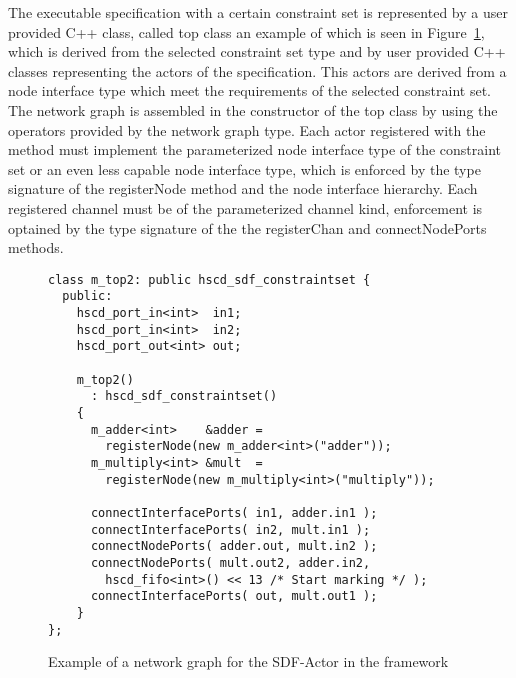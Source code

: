 The executable specification with a certain constraint set is
represented by a user provided C++ class, called top class an example of
which is seen in Figure~\ref{example-sdf-constraintset}, which is
derived from the selected \SysteMoC{} constraint set type and by
user provided C++ classes representing the actors of the specification.
This actors are derived from a \SysteMoC{} node interface type which
meet the requirements of the selected constraint set. The network graph
is assembled in the constructor of the top class by using the
operators provided by the \SysteMoC{} network graph type.
Each actor registered with the  method must implement
the parameterized node interface type of the constraint set or an even
less capable node interface type, which is enforced by the type signature
of the registerNode method and the node interface hierarchy.
Each registered channel must be of the parameterized channel kind,
enforcement is optained by the type signature of the
the registerChan and connectNodePorts methods.

\begin{figure}[h]
\centering
\begin{verbatim}
class m_top2: public hscd_sdf_constraintset {
  public:
    hscd_port_in<int>  in1;
    hscd_port_in<int>  in2;
    hscd_port_out<int> out;
    
    m_top2()
      : hscd_sdf_constraintset()
    {
      m_adder<int>    &adder =
        registerNode(new m_adder<int>("adder"));
      m_multiply<int> &mult  =
        registerNode(new m_multiply<int>("multiply"));
      
      connectInterfacePorts( in1, adder.in1 );
      connectInterfacePorts( in2, mult.in1 );
      connectNodePorts( adder.out, mult.in2 );
      connectNodePorts( mult.out2, adder.in2,
        hscd_fifo<int>() << 13 /* Start marking */ );
      connectInterfacePorts( out, mult.out1 );
    }
};
\end{verbatim}
\caption{\label{example-sdf-constraintset}Example of a network graph for the SDF-Actor in the \SysteMoC{} framework}
\end{figure}



